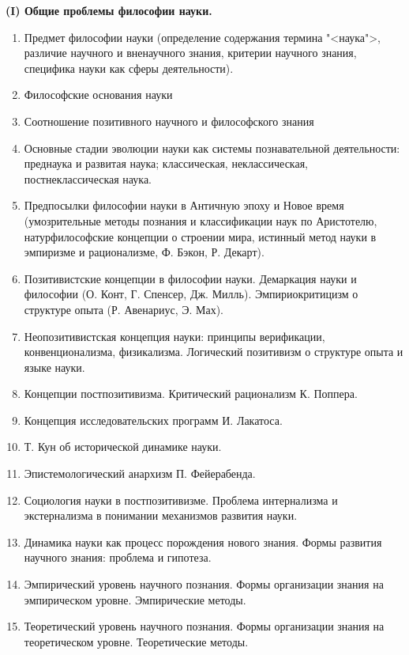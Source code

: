 \documentclass[main.tex]{subfiles}
\begin{document}
\setcounter{section}{102}


\vspace{3mm}
{\parindent0pt\textbf{(I) Общие проблемы философии науки.}}

\begin{enumerate}[nosep,leftmargin=*]
	\item Предмет философии науки (определение содержания термина "<наука">, различие научного и вненаучного знания, критерии научного знания, специфика науки как сферы деятельности).
	\item Философские основания науки
	\item Соотношение позитивного научного и философского знания
	\item Основные стадии эволюции науки как системы познавательной деятельности: преднаука и развитая наука; классическая, неклассическая, постнеклассическая наука.
	\item Предпосылки философии науки в Античную эпоху и Новое время (умозрительные методы познания и классификации наук по Аристотелю, натурфилософские концепции о строении мира, истинный метод науки в эмпиризме и рационализме, Ф. Бэкон, Р. Декарт).
	\item Позитивистские концепции в философии науки. Демаркация науки и философии (О. Конт, Г. Спенсер, Дж. Милль). Эмпириокритицизм о структуре опыта (Р. Авенариус, Э. Мах).
	\item Неопозитивистская концепция науки: принципы верификации, конвенционализма, физикализма. Логический позитивизм о структуре опыта и языке науки.
	\item Концепции постпозитивизма. Критический рационализм К. Поппера.
	\item Концепция исследовательских программ И. Лакатоса.
	\item Т. Кун об исторической динамике науки.
	\item Эпистемологический анархизм П. Фейерабенда.
	\item Социология науки в постпозитивизме. Проблема интернализма и экстернализма в понимании механизмов развития науки.
	\item Динамика науки как процесс порождения нового знания. Формы развития научного знания: проблема и гипотеза.
	\item Эмпирический уровень научного познания. Формы организации знания на эмпирическом уровне. Эмпирические методы.
	\item Теоретический уровень научного познания. Формы организации знания на теоретическом уровне. Теоретические методы.

\end{enumerate}
\end{document}

